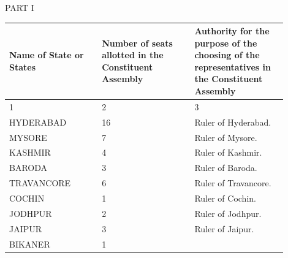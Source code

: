 \begin{center}
PART I\end{center}


\par\medskip
\begin{longtable}{|p{0.30\linewidth}|p{0.30\linewidth}|p{0.30\linewidth}|}
\hline
Name of State or States

 & Number of seats allotted in the Constituent Assembly

 & Authority for the purpose of the choosing of the representatives in the Constituent Assembly

 \\
\hline
1

 & 2

 & 3

 \\
\hline
HYDERABAD

 & 16

 & Ruler of Hyderabad.

 \\
\hline
MYSORE

 & 7

 & Ruler of Mysore.

 \\
\hline
KASHMIR

 & 4

 & Ruler of Kashmir.

 \\
\hline
BARODA

 & 3

 & Ruler of Baroda.

 \\
\hline
TRAVANCORE

 & 6

 & Ruler of Travancore.

 \\
\hline
COCHIN

 & 1

 & Ruler of Cochin.

 \\
\hline
JODHPUR

 & 2

 & Ruler of Jodhpur.

 \\
\hline
JAIPUR

 & 3

 & Ruler of Jaipur.

 \\
\hline
BIKANER

 & 1


\end{longtable}
